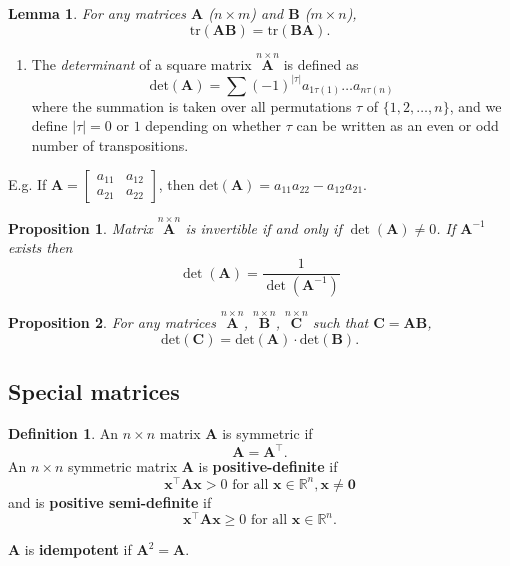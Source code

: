 \documentclass[]{book}
\providecommand{\tightlist}{%
  \setlength{\itemsep}{0pt}\setlength{\parskip}{0pt}}
\newtheorem{lemma}{Lemma}[chapter]
\newtheorem{proposition}{Proposition}[chapter]
\theoremstyle{definition}
\newtheorem{definition}{Definition}[chapter]
\theoremstyle{definition}
\theoremstyle{definition}
\theoremstyle{remark}
\begin{document}
\begin{lemma}
\protect\hypertarget{lem:trace}{}{\label{lem:trace} }For any matrices \(\boldsymbol A\) (\(n \times m\)) and \(\boldsymbol B\) (\(m \times n\)),
\[
\text{tr}(\boldsymbol A\boldsymbol B) = \text{tr}(\boldsymbol B\boldsymbol A).
\]
\end{lemma}

\begin{enumerate}
\def\labelenumi{\arabic{enumi}.}
\setcounter{enumi}{6}
\tightlist
\item
  The \emph{determinant} of a square matrix \(\stackrel{n\times n}{\mathbf A}\) is
  defined as
  \[ \text{det}({\mathbf A})=\sum (-1)^{|\tau |} a_{1\tau(1)}\dots a_{n\tau (n)} \]
  where the summation is taken over all permutations \(\tau\) of \(\{1,2,\dots ,n\}\),
  and we define \(|\tau |=0\) or \(1\) depending on whether \(\tau\) can be written as an even or
  odd number of transpositions.
\end{enumerate}

E.g. If \({\mathbf A}=\left[ \begin{array}{cc} a_{11}&a_{12}\\ a_{21}&a_{22} \end{array} \right]\),
then \(\text{det}({\mathbf A})=a_{11}a_{22}-a_{12}a_{21}\).

\begin{proposition}
\protect\hypertarget{prp:det1}{}{\label{prp:det1} }Matrix \(\stackrel{n\times n}{\mathbf A}\) is invertible if and only if \(\det(\boldsymbol A)\not = 0\). If \(\boldsymbol A^{-1}\) exists then
\[\det(\boldsymbol A)=\frac{1}{\det(\boldsymbol A^{-1})}\]
\end{proposition}

\begin{proposition}
\protect\hypertarget{prp:det3}{}{\label{prp:det3} }For any matrices \(\stackrel{n\times n}{\mathbf A}\),
\(\stackrel{n\times n}{\mathbf B}\), \(\stackrel{n\times n}{\mathbf C}\) such that \({\mathbf C}={\mathbf{AB}}\),
\[ \text{det}({\mathbf C})=\text{det}({\mathbf A}) \cdot \text{det}({\mathbf B}).\]
\end{proposition}

\hypertarget{special-matrices}{%
\subsection{Special matrices}\label{special-matrices}}

\begin{definition}
\protect\hypertarget{def:posdef}{}{\label{def:posdef} }An \(n\times n\) matrix \(\boldsymbol A\) is symmetric if
\[\boldsymbol A= \boldsymbol A^\top.\]
An \(n\times n\) symmetric matrix \(\boldsymbol A\) is \textbf{positive-definite} if
\[\boldsymbol x^\top \boldsymbol A\boldsymbol x>0 \mbox{ for all } \boldsymbol x\in \mathbb{R}^n, \boldsymbol x\not = \boldsymbol 0\]
and is \textbf{positive semi-definite} if
\[\boldsymbol x^\top \boldsymbol A\boldsymbol x\geq 0 \mbox{ for all } \boldsymbol x\in \mathbb{R}^n.\]

\(\boldsymbol A\) is \textbf{idempotent} if \(\boldsymbol A^2=\boldsymbol A\).
\end{definition}
\end{document}
